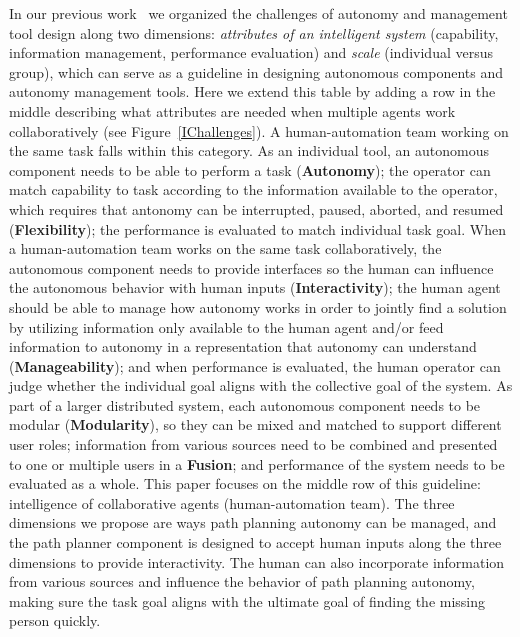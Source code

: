 \documentclass[journal]{IEEEtran}
\begin{document}
In our previous work~\cite{Lin2010Supporting} we organized the challenges of autonomy and management tool design along two dimensions: \textit{attributes of an intelligent system} (capability, information management, performance evaluation) and \textit{scale} (individual versus group), which can serve as a guideline in designing autonomous components and autonomy management tools. Here we extend this table by adding a row in the middle describing what attributes are needed when multiple agents work collaboratively (see Figure~\ref{IChallenges}). A human-automation team working on the same task falls within this category. As an individual tool, an autonomous component needs to be able to perform a task (\textbf{Autonomy}); the operator can match capability to task according to the information available to the operator, which requires that antonomy can be interrupted, paused, aborted, and resumed (\textbf{Flexibility}); the performance is evaluated to match individual task goal. When a human-automation team works on the same task collaboratively, the autonomous component needs to provide interfaces so the human can influence the autonomous behavior with human inputs (\textbf{Interactivity}); the human agent should be able to manage how autonomy works in order to jointly find a solution by utilizing information only available to the human agent and/or feed information to autonomy in a representation that autonomy can understand (\textbf{Manageability}); and when performance is evaluated, the human operator can judge whether the individual goal aligns with the collective goal of the system. As part of a larger distributed system, each autonomous component needs to be modular (\textbf{Modularity}), so they can be mixed and matched to support different user roles; information from various sources need to be combined and presented to one or multiple users in a \textbf{Fusion}; and performance of the system needs to be evaluated as a whole. This paper focuses on the middle row of this guideline: intelligence of collaborative agents (human-automation team). The three dimensions we propose are ways path planning autonomy can be managed, and the path planner component is designed to accept human inputs along the three dimensions to provide interactivity. The human can also incorporate information from various sources and influence the behavior of path planning autonomy, making sure the task goal aligns with the ultimate goal of finding the missing person quickly.
\end{document}
